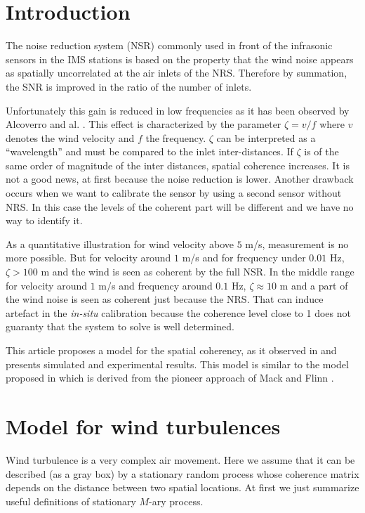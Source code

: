 \clearpage
\section{Introduction}
The noise reduction system (NSR) commonly used in front of the infrasonic sensors in the IMS stations is based on the property that the wind noise appears as spatially uncorrelated at the air inlets of the NRS. Therefore by summation, the SNR is improved in the ratio of the number of inlets. 

Unfortunately this gain is reduced in low frequencies as it has been observed by Alcoverro and al. \cite{alcoverro:2005}. This effect is characterized by the parameter $\zeta=v/f$ where $v$ denotes the wind velocity and $f$ the frequency. $\zeta$ can be interpreted as a ``wavelength'' and must be compared to the inlet inter-distances. If $\zeta$ is of the same order of magnitude of the inter distances, spatial coherence increases. It is not a good news, at first because the noise reduction  is lower. Another drawback occurs when we want to calibrate the sensor by using a second sensor without NRS. In this case the levels of the coherent part will be different and we have no way to identify it.

As a quantitative illustration for wind velocity above $5$ m/s, measurement is no more possible. But for velocity around $1$ m/s and for frequency under $0.01$ Hz, $\zeta>100$ m and the wind is seen as coherent by the full NSR. In the middle range for velocity around $1$ m/s and frequency around $0.1$ Hz, $\zeta\approx 10$ m and a part of the wind noise is seen as coherent just because the NRS. That can induce artefact in the {\it in-situ} calibration because the coherence level close to 1 does not guaranty that the system to solve is well determined.


This article proposes a model for the spatial coherency, as it observed in \cite{alcoverro:2005} and presents simulated and experimental results. This model is similar to the model proposed in \cite{nouvellet_itwb:2013} which is derived from the pioneer approach of Mack and Flinn \cite{mack_flinn:1971}.

\section{Model for wind turbulences}
Wind turbulence is a very complex air movement. Here we assume that it can be described (as a gray box) by a stationary random  process whose coherence matrix depends on the distance between two spatial locations. At first we just summarize useful definitions of stationary $M$-ary process.

